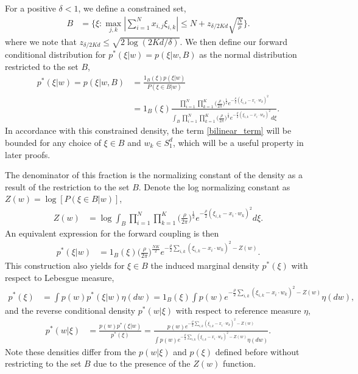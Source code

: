 \documentclass{article}
\numberwithin{equation}{section}
\theoremstyle{Lemma}
\theoremstyle{Corollary}
\theoremstyle{Theorem}
\theoremstyle{Remark}
\begin{document}
For a positive $\delta< 1$, we define a constrained set,
\begin{align}
   B&= \Big\{\xi: \max_{j, k}|\sum_{i=1}^{N}x_{i,j}\xi_{i,k}| \leq N + z_{\delta/2Kd} \sqrt{\frac{N}{\rho}}\Big\}.\label{B_set_def}
\end{align}
where we note that $z_{\delta/2Kd} \le \sqrt{2 \log(2Kd/\delta)}$.
We then define our forward conditional distribution for $p^{*}(\xi|w) = p(\xi|w,B)$ as the normal distribution restricted to the set $B$,
\begin{align}
    p^{*}(\xi|w) =p(\xi|w,B)&=\frac{1_{B}(\xi)p(\xi|w)}{P(\xi \in B|w)} \\
    &=1_{B}(\xi)\frac{\prod_{i=1}^{N}\prod_{k=1}^{K}\big(\frac{\rho}{2\pi} \big)^{\frac{1}{2}}e^{-\frac{\rho}{2}(\xi_{i,k} - x_{i}\cdot w_{k})^{2}}}{\int_{B} \prod_{i=1}^{N}\prod_{k=1}^{K}\big(\frac{\rho}{2\pi}\big)^{\frac{1}{2}}e^{-\frac{\rho}{2}(\xi_{i,k} - x_{i}\cdot w_{k})^{2}}d\xi}.
\end{align}
In accordance with this constrained density, the term \eqref{bilinear_term} will be bounded for any choice of $\xi \in B$ and $w_{k} \in S^{d}_{1}$, which will be a useful property in later proofs.

The denominator of this fraction is the normalizing constant of the density as a result of the restriction to the set $B$. Denote the log normalizing constant as $Z(w) = \log[P(\xi \in B|w)]$,
\begin{align}
    Z(w)&= \log {\int_{B} \prod_{i=1}^{N}\prod_{k=1}^{K}\big(\frac{\rho}{2\pi}\big)^{\frac{1}{2}}e^{-\frac{\rho}{2}(\xi_{i,k} - x_{i}\cdot w_{k})^{2}}d\xi}\label{Z_w_def}.
\end{align}
An equivalent expression for the forward coupling is then
\begin{align}
    p^{*}(\xi|w)&= 1_{B}(\xi)\big(\frac{\rho}{2\pi})^{\frac{NK}{2}}e^{-\frac{\rho}{2}\sum_{i,k}(\xi_{i,k}-x_{i}\cdot w_{k})^{2}-Z(w)}.
\end{align}
This construction also yields for $\xi \in B$ the induced marginal density $p^{*}(\xi)$ with respect to Lebesgue measure, 
\begin{align}
p^{*}(\xi)&= \int p(w)p^{*}(\xi|w)\eta(dw)=1_{B}(\xi) \int p(w)e^{-\frac{\rho}{2}\sum_{i,k}(\xi_{i,k}-x_{i}\cdot w_{k})^{2}-Z(w)}\eta(dw),
\end{align}
and the reverse conditional density $p^{*}(w|\xi)$ with respect to reference measure $\eta$,
\begin{align}
p^{*}(w|\xi)&=\frac{p(w)p^{*}(\xi|w)}{p^{*}(\xi)}= \frac{p(w)e^{-\frac{\rho}{2}\sum_{i,k}(\xi_{i,k}-x_{i}\cdot w_{k})^{2}-Z(w)}}{\int p(w)e^{-\frac{\rho}{2}\sum_{i,k}(\xi_{i,k}-x_{i}\cdot w_{k})^{2}-Z(w)}\eta(dw)}.
\end{align}
Note these densities differ from the $p(w|\xi)$ and $p(\xi)$ defined before without restricting to the set $B$ due to the presence of the $Z(w)$ function.
\end{document}
